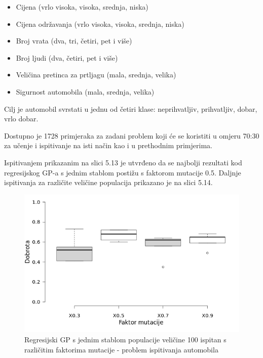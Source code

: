 \documentclass[times, utf8, zavrsni]{fer}
\begin{document}
\begin{itemize}
\item Cijena (vrlo visoka, visoka, srednja, niska)
\item Cijena održavanja (vrlo visoka, visoka, srednja, niska)
\item Broj vrata (dva, tri, četiri, pet i više)
\item Broj ljudi (dva, četiri, pet i više)
\item Veličina pretinca za prtljagu (mala, srednja, velika)
\item Sigurnost automobila (mala, srednja, velika)
\end{itemize}

Cilj je automobil svrstati u jednu od četiri klase: neprihvatljiv, prihvatljiv, dobar, vrlo dobar.

Dostupno je 1728 primjeraka za zadani problem koji će se koristiti u omjeru 70:30 za učenje i ispitivanje na isti način kao i u prethodnim primjerima.

Ispitivanjem prikazanim na slici 5.13 je utvrđeno da se najbolji rezultati kod regresijskog GP-a s jednim stablom postižu s faktorom mutacije 0.5. Daljnje ispitivanja za različite veličine populacija prikazano je na slici 5.14.

\begin{figure}[htb]
\centering
\includegraphics[scale=0.5]{grafovi/boxplotCarSTest}
\caption{Regresijski GP s jednim stablom populacije veličine 100 ispitan s različitim faktorima mutacije - problem ispitivanja automobila}
\end{figure}
\end{document}
